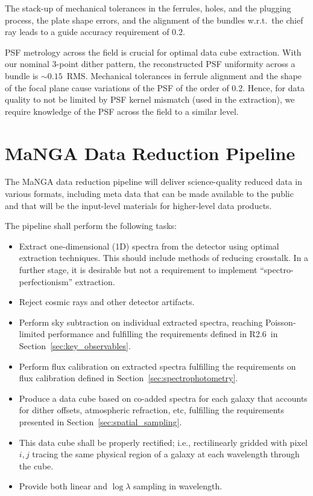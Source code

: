 \documentclass[preprint,11pt]{aastex}
\begin{document}
The stack-up of mechanical tolerances in the ferrules, holes, and the
plugging process, the plate shape errors, and the alignment of the
bundles w.r.t.\ the chief ray leads to a guide accuracy requirement of
0.2\arcsec.

PSF metrology across the field is crucial for optimal data cube extraction. With
our nominal 3-point dither pattern, the reconstructed PSF uniformity across a 
bundle is $\sim 0.15$\arcsec\ RMS. Mechanical tolerances in ferrule alignment and  the
shape of the focal plane cause variations of the PSF of the order of 0.2\arcsec. 
Hence, for data quality to not be limited by PSF kernel mismatch (used in the
extraction),  we require knowledge of the PSF across the field to a similar level.

\section{MaNGA Data Reduction Pipeline} \label{sec:data_reduction_pipeline}

The MaNGA data reduction pipeline will deliver science-quality reduced
data in various formats, including meta data that can be made available
to the public and that will be the input-level materials for
higher-level data products. 

The pipeline shall perform the following tasks:
\begin{itemize}
\item Extract one-dimensional (1D) spectra from the detector using
  optimal extraction techniques. This should include methods of
  reducing crosstalk. In a further stage, it is desirable but not a
  requirement to implement ``spectro-perfectionism'' extraction.
\item Reject cosmic rays and other detector artifacts.
\item Perform sky subtraction on individual extracted spectra,
  reaching Poisson-limited performance and fulfilling the requirements
  defined in R2.6\ in Section~\ref{sec:key_observables}. 
\item Perform flux calibration on extracted spectra fulfilling the
  requirements on flux calibration defined in Section~\ref{sec:spectrophotometry}.
\item Produce a data cube based on co-added spectra for each galaxy
  that accounts for dither offsets, atmospheric refraction, etc,
  fulfilling the requirements presented in
  Section~\ref{sec:spatial_sampling}.
\item This data cube shall be properly rectified; i.e., rectilinearly
  gridded with pixel $i,j$ tracing the same physical region of a galaxy
  at each wavelength through the cube.
\item Provide both linear and $\log \lambda$ sampling in wavelength.
\end{itemize}
\end{document}
